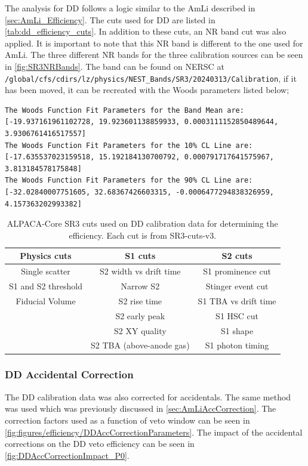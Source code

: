 The analysis for DD follows a logic similar to the AmLi described in \autoref{sec:AmLi_Efficiency}.
The cuts used for DD are listed in \autoref{tab:dd_efficiency_cuts}.
In addition to these cuts, an NR band cut was also applied. 
It is important to note that this NR band is different to the one used for AmLi. The three different NR bands for the three calibration sources can be seen in \autoref{fig:SR3NRBands}.
The band can be found on NERSC at \lstinline{/global/cfs/cdirs/lz/physics/NEST_Bands/SR3/20240313/Calibration}, if it has been moved, it can be recreated with the Woods parameters listed below;
\begin{lstlisting}
The Woods Function Fit Parameters for the Band Mean are:  [-19.937161961102728, 19.923601138859933, 0.0003111152850489644, 3.9306761416517557]
The Woods Function Fit Parameters for the 10% CL Line are:  [-17.635537023159518, 15.192184130700792, 0.000791717641575967, 3.813184578175848]
The Woods Function Fit Parameters for the 90% CL Line are:  [-32.02840007751605, 32.68367426603315, -0.0006477294838326959, 4.157363202993382]
\end{lstlisting}
\begin{table}
    \centering
    \begin{tabular}{c|c|c}
     Physics cuts & S1 cuts & S2 cuts  \\
     \hline
     Single scatter  & S2 width vs drift time & S1 prominence cut \\
     S1 and S2 threshold & Narrow S2 & Stinger event cut \\
     Fiducial Volume & S2 rise time & S1 TBA vs drift time \\
     & S2 early peak & S1 HSC cut \\
     & S2 XY quality & S1 shape \\
     & S2 TBA (above-anode gas) & S1 photon timing \\
    \end{tabular}
    \caption{ALPACA-Core SR3 cuts used on DD calibration data for determining the efficiency.
    Each cut is from SR3-cuts-v3.
    }
    \label{tab:dd_efficiency_cuts}
\end{table}
\subsubsection{DD Accidental Correction}
The DD calibration data was also corrected for accidentals. The same method was used which was previously discussed in \autoref{sec:AmLiAccCorrection}. The correction factors used as a function of veto window can be seen in \autoref{fig:figures/efficiency/DDAccCorrectionParameters}. 
The impact of the accidental corrections on the DD veto efficiency can be seen in \autoref{fig:DDAccCorrectionImpact_P0}.

